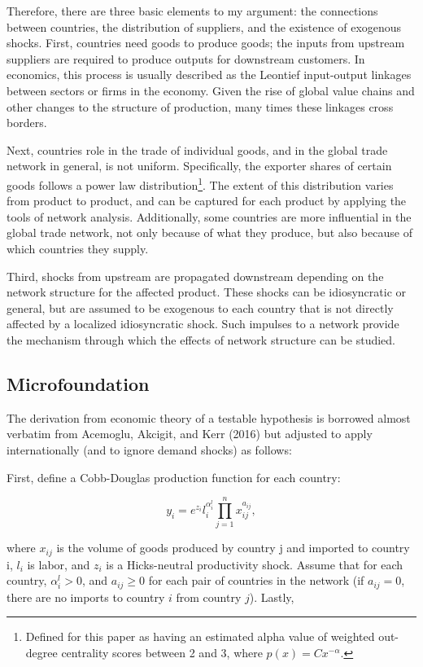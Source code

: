 \documentclass[10pt,letterpaper]{article}
\begin{document}
Therefore, there are three basic elements to my argument: the connections between countries, the distribution of suppliers, and the existence of exogenous shocks. First, countries need goods to produce goods; the inputs from upstream suppliers are required to produce outputs for downstream customers. In economics, this process is usually described as the Leontief input-output linkages between sectors or firms in the economy. Given the rise of global value chains and other changes to the structure of production, many times these linkages cross borders.

Next, countries role in the trade of individual goods, and in the global trade network in general, is not uniform. Specifically, the exporter shares of certain goods follows a power law distribution\footnote{Defined for this paper as having an estimated alpha value of weighted out-degree centrality scores between 2 and 3, where $p(x) = Cx^{-\alpha}$.}. The extent of this distribution varies from product to product, and can be captured for each product by applying the tools of network analysis. Additionally, some countries are more influential in the global trade network, not only because of what they produce, but also because of which countries they supply.

Third, shocks from upstream are propagated downstream depending on the network structure for the affected product. These shocks can be idiosyncratic or general, but are assumed to be exogenous to each country that is not directly affected by a localized idiosyncratic shock. Such impulses to a network provide the mechanism through which the effects of network structure can be studied.

\subsection{Microfoundation} \label{modelsmicro}

The derivation from economic theory of a testable hypothesis is borrowed almost verbatim from Acemoglu, Akcigit, and Kerr (2016) but adjusted to apply internationally (and to ignore demand shocks) as follows:

First, define a Cobb-Douglas production function for each country:

\begin{equation*}
y_i = e^{z_i}l_i^{\alpha_i^l} \prod_{j=1}^{n} x_{ij}^{a_{ij}},
\end{equation*}

where $x_{ij}$ is the volume of goods produced by country j and imported to country i, $l_i$ is labor, and $z_i$ is a Hicks-neutral productivity shock. Assume that for each country, $\alpha_i^l >0$, and $a_{ij} \geq 0$ for each pair of countries in the network (if $a_{ij} = 0$, there are no imports to country $i$ from country $j$). Lastly,
\end{document}

